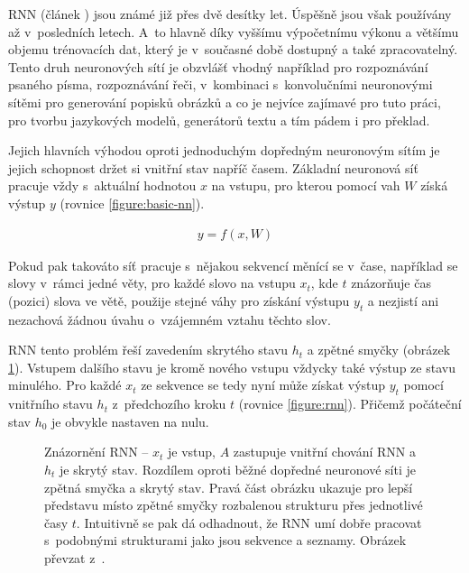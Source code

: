 RNN (článek \cite{rnn}) jsou známé již přes dvě desítky let. Úspěšně jsou však používány až v~posledních letech. A~to hlavně díky vyššímu výpočetnímu výkonu a většímu objemu trénovacích dat, který je v~současné době dostupný a také zpracovatelný. Tento druh neuronových sítí je obzvlášť vhodný například pro rozpoznávání psaného písma, rozpoznávání řeči, v~kombinaci s~konvolučními neuronovými sítěmi pro generování popisků obrázků a co je nejvíce zajímavé pro tuto práci, pro tvorbu jazykových modelů, generátorů textu a tím pádem i pro překlad.

Jejich hlavních výhodou oproti jednoduchým dopředným neuronovým sítím je jejich schopnost držet si vnitřní stav napříč časem. Základní neuronová síť pracuje vždy s~aktuální hodnotou $x$ na vstupu, pro kterou pomocí vah $W$ získá výstup $y$ (rovnice \ref{figure:basic-nn}).

\begin{align}\label{figure:basic-nn}
  y = f (x, W)
\end{align}

Pokud pak takováto síť pracuje s~nějakou sekvencí měnící se v~čase, například se slovy v~rámci jedné věty, pro každé slovo na vstupu $x_t$, kde $t$ znázorňuje čas (pozici) slova ve větě, použije stejné váhy pro získání výstupu $y_t$ a nezjistí ani nezachová žádnou úvahu o~vzájemném vztahu těchto slov.

RNN tento problém řeší zavedením skrytého stavu $h_t$ a zpětné smyčky (obrázek \ref{img:rnn}). Vstupem dalšího stavu je kromě nového vstupu vždycky také výstup ze stavu minulého. Pro každé $x_t$ ze sekvence se tedy nyní může získat výstup $y_t$ pomocí vnitřního stavu $h_t$ z~předchozího kroku $t$ (rovnice \ref{figure:rnn}). Přičemž počáteční stav  $h_0$ je obvykle nastaven na nulu.


\begin{figure}[H]
    \begin{center}
    \end{center}
	\caption{Znázornění RNN -- $x_t$ je vstup, $A$ zastupuje vnitřní chování RNN a $h_t$ je skrytý stav. Rozdílem oproti běžné dopředné neuronové síti je zpětná smyčka a skrytý stav. Pravá část obrázku ukazuje pro lepší představu místo zpětné smyčky rozbalenou strukturu přes jednotlivé časy $t$. Intuitivně se pak dá odhadnout, že RNN umí dobře pracovat s~podobnými strukturami jako jsou sekvence a seznamy. Obrázek převzat z~\cite{understandingLSTM}.}	
	\label{img:rnn}
\end{figure}

